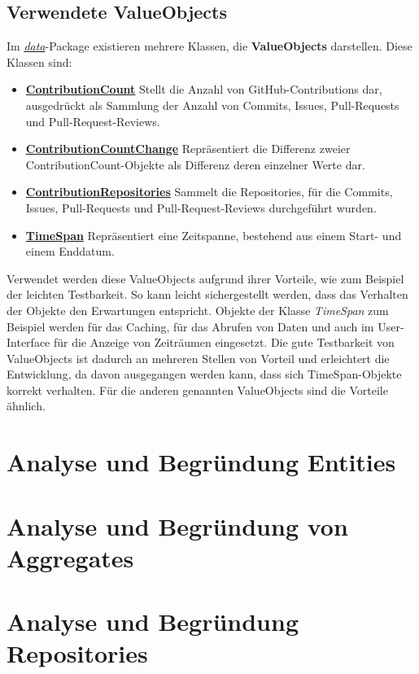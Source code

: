 \documentclass[12pt]{article}
\begin{document}
\subsection{Verwendete ValueObjects}
Im \textit{\href{https://github.com/lukaspanni/OpenSourceStats/tree/main/app/src/main/java/de/lukaspanni/opensourcestats/data}{data}}-Package existieren mehrere Klassen, die \textbf{ValueObjects} darstellen.
\newline
Diese Klassen sind:
\begin{itemize}
\item{\textbf{\href{https://github.com/lukaspanni/OpenSourceStats/blob/main/app/src/main/java/de/lukaspanni/opensourcestats/data/ContributionCount.java}{ContributionCount}}}
\newline
Stellt die Anzahl von GitHub-Contributions dar, ausgedrückt als Sammlung der Anzahl von Commits, Issues, Pull-Requests und Pull-Request-Reviews.
\item{\textbf{\href{https://github.com/lukaspanni/OpenSourceStats/blob/main/app/src/main/java/de/lukaspanni/opensourcestats/data/ContributionCountChange.java}{ContributionCountChange}}}
\newline
Repräsentiert die Differenz zweier ContributionCount-Objekte als Differenz deren einzelner Werte dar.
\item{\textbf{\href{https://github.com/lukaspanni/OpenSourceStats/blob/main/app/src/main/java/de/lukaspanni/opensourcestats/data/ContributionRepositories.java}{ContributionRepositories}}}
\newline
Sammelt die Repositories, für die Commits, Issues, Pull-Requests und Pull-Request-Reviews durchgeführt wurden.
\item{\textbf{\href{https://github.com/lukaspanni/OpenSourceStats/blob/main/app/src/main/java/de/lukaspanni/opensourcestats/data/TimeSpan.java}{TimeSpan}}}
\newline
Repräsentiert eine Zeitspanne, bestehend aus einem Start- und einem Enddatum.
\end{itemize}
Verwendet werden diese ValueObjects aufgrund ihrer Vorteile, wie zum Beispiel der leichten Testbarkeit.
So kann leicht sichergestellt werden, dass das Verhalten der Objekte den Erwartungen entspricht.
\newline
Objekte der Klasse \textit{TimeSpan} zum Beispiel werden für das Caching, für das Abrufen von Daten und auch im User-Interface für die Anzeige von Zeiträumen eingesetzt.
Die gute Testbarkeit von ValueObjects ist dadurch an mehreren Stellen von Vorteil und erleichtert die Entwicklung, da davon ausgegangen werden kann, dass sich TimeSpan-Objekte korrekt verhalten.
Für die anderen genannten ValueObjects sind die Vorteile ähnlich.


\newpage

\section{Analyse und Begründung Entities}

\newpage

\section{Analyse und Begründung von Aggregates}

\newpage

\section{Analyse und Begründung Repositories}
\end{document}
